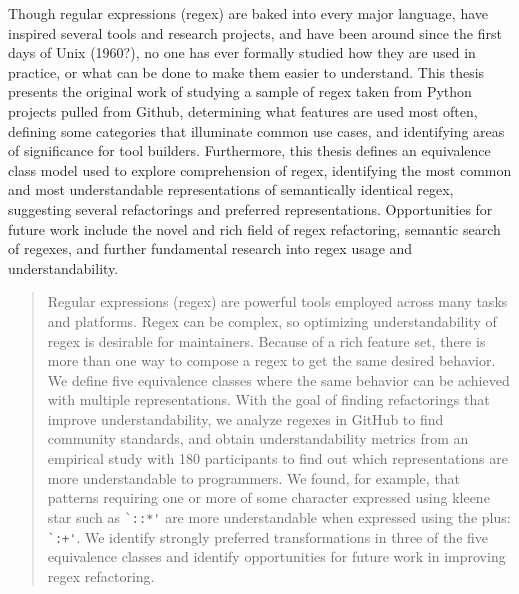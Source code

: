 \cleardoublepage {}
{}
Though regular expressions (regex) are baked into every major language, have inspired several tools and research projects, and have been around since the first days of Unix (1960?), no one has ever formally studied how they are used in practice, or what can be done to make them easier to understand.  This thesis presents the original work of studying a sample of regex taken from Python projects pulled from Github, determining what features are used most often, defining some categories that illuminate common use cases, and identifying areas of significance for tool builders.  Furthermore, this thesis defines an equivalence class model used to explore comprehension of regex, identifying the most common and most understandable representations of semantically identical regex, suggesting several refactorings and preferred representations.  Opportunities for future work include the novel and rich field of regex refactoring, semantic search of regexes, and further fundamental research into regex usage and understandability.
\begin{abstract}
Regular expressions (regex) are powerful tools employed across many tasks and platforms.
Regex can be complex, so optimizing understandability of regex is desirable for maintainers.
Because of a rich feature set, there is more than one way to compose a regex to get the same desired behavior.
We define five equivalence classes where the same behavior can be achieved with multiple representations.
With the goal of finding refactorings that improve understandability, we analyze regexes in GitHub to find community standards, and obtain understandability metrics from an empirical study with 180 participants to find out which representations are more  understandable to programmers.
We found, for example, that patterns requiring one or more of some character expressed using kleene star such as \verb!`::*'! are more understandable when expressed using the plus: \verb!`:+'!.  We identify strongly preferred transformations in three of the five equivalence classes and identify opportunities for future work in improving regex refactoring.
\end{abstract}
